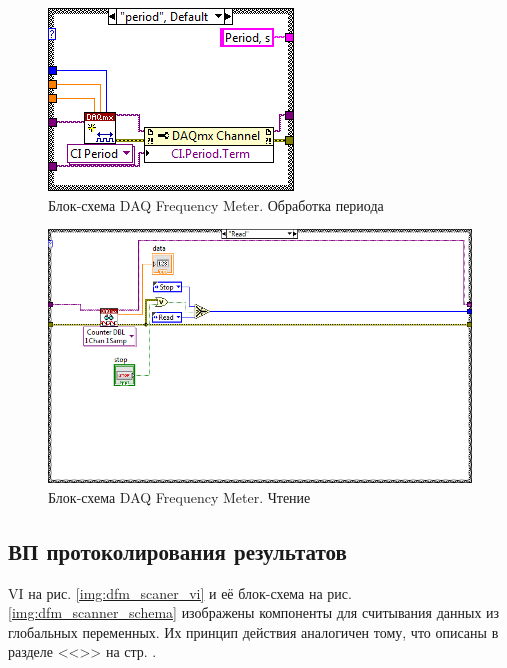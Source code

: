 \documentclass[a4paper,14pt]{article}
\begin{document}
\begin{figure}[H]
	\centering
	\includegraphics[width=0.7\linewidth]{image/dfm_schema_period}
	\caption{Блок-схема DAQ Frequency Meter. Обработка периода}\label{img:dfm_schema_period}
\end{figure}

\begin{figure}[H]
	\centering
	\includegraphics[width=\linewidth]{image/dfm_schema_read}
	\caption{Блок-схема DAQ Frequency Meter. Чтение}\label{img:dfm_schema_read}
\end{figure}

\subsection{ВП протоколирования результатов}

VI на рис. \ref{img:dfm_scaner_vi} и её блок-схема на рис. \ref{img:dfm_scanner_schema} изображены компоненты для считывания данных из глобальных переменных. Их принцип действия аналогичен тому, что описаны в разделе <<>> на стр. \pageref{subs:proto}.
\end{document}

